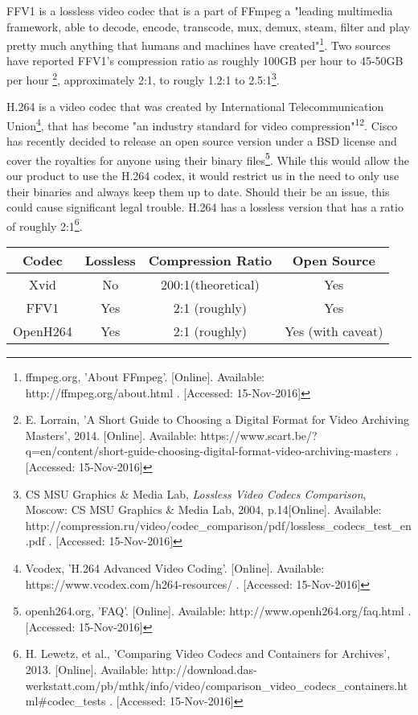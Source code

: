\documentclass[letterpaper,10pt,onecolumn,draftclsnofoot]{IEEEtran}
\begin{document}
FFV1 is a lossless video codec that is a part of FFmpeg a "leading multimedia framework, able to decode, encode, transcode, mux, demux, steam, filter and play pretty much anything that humans and machines have created"\footnote{ffmpeg.org, 'About FFmpeg'. [Online]. Available: http://ffmpeg.org/about.html . [Accessed: 15-Nov-2016] }. %
Two sources have reported FFV1's compression ratio as roughly 100GB per hour to 45-50GB per hour \footnote{E. Lorrain, 'A Short Guide to Choosing a Digital Format for Video Archiving Masters', 2014. [Online]. Available: https://www.scart.be/?q=en/content/short-guide-choosing-digital-format-video-archiving-masters . [Accessed: 15-Nov-2016] }, approximately 2:1, to rougly 1.2:1 to 2.5:1\footnote{CS MSU Graphics \& Media Lab, \textit{Lossless Video Codecs Comparison}, Moscow: CS MSU Graphics \& Media Lab, 2004, p.14[Online]. Available: http://compression.ru/video/codec\_comparison/pdf/lossless\_codecs\_test\_en.pdf . [Accessed: 15-Nov-2016] }. %

H.264 is a video codec that was created by International Telecommunication Union\footnote{Vcodex, 'H.264 Advanced Video Coding'. [Online]. Available: https://www.vcodex.com/h264-resources/ . [Accessed: 15-Nov-2016] }, that has become "an industry standard for video compression"\textsuperscript{12}. %
Cisco has recently decided to release an open source version under a BSD license and cover the royalties for anyone using their binary files\footnote{openh264.org, 'FAQ'. [Online]. Available: http://www.openh264.org/faq.html . [Accessed: 15-Nov-2016] }. %
While this would allow the our product to use the H.264 codex, it would restrict us in the need to only use their binaries and always keep them up to date.
Should their be an issue, this could cause significant legal trouble.
H.264 has a lossless version that has a ratio of roughly 2:1\footnote{H. Lewetz, et al., 'Comparing Video Codecs and Containers for Archives', 2013. [Online]. Available: http://download.das-werkstatt.com/pb/mthk/info/video/comparison\_video\_codecs\_containers.html\#codec\_tests . [Accessed: 15-Nov-2016] }. %

\begin{tabular}{|c|c|c|c|}
	\hline
	\textbf{Codec} & \textbf{Lossless} & \textbf{Compression Ratio} & \textbf{Open Source} \\
	\hline
	Xvid & No & 200:1(theoretical) & Yes \\
	\hline
	FFV1 & Yes & 2:1 (roughly) & Yes \\
	\hline
	OpenH264 & Yes & 2:1 (roughly) & Yes (with caveat) \\
	\hline
	
\end{tabular}
\end{document}
